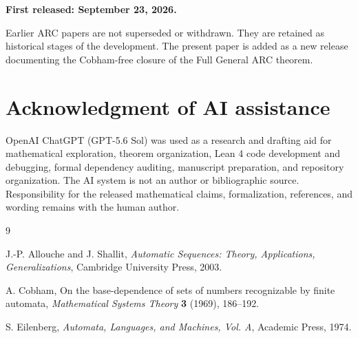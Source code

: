 \documentclass[11pt]{article}
\theoremstyle{remark}
\begin{document}
\textbf{First released: September 23, 2026.}

Earlier ARC papers are not superseded or withdrawn.  They are retained as
historical stages of the development.  The present paper is added as a new
release documenting the Cobham-free closure of the Full General ARC theorem.

\section*{Acknowledgment of AI assistance}

OpenAI ChatGPT (GPT-5.6 Sol) was used as a research and drafting aid for
mathematical exploration, theorem organization, Lean 4 code development and
debugging, formal dependency auditing, manuscript preparation, and repository
organization.  The AI system is not an author or bibliographic source.
Responsibility for the released mathematical claims, formalization, references,
and wording remains with the human author.

\begin{thebibliography}{9}

J.-P. Allouche and J. Shallit,
\emph{Automatic Sequences: Theory, Applications, Generalizations},
Cambridge University Press, 2003.

A. Cobham,
On the base-dependence of sets of numbers recognizable by finite automata,
\emph{Mathematical Systems Theory} \textbf{3} (1969), 186--192.

S. Eilenberg,
\emph{Automata, Languages, and Machines, Vol. A},
Academic Press, 1974.

\end{thebibliography}
\end{document}
